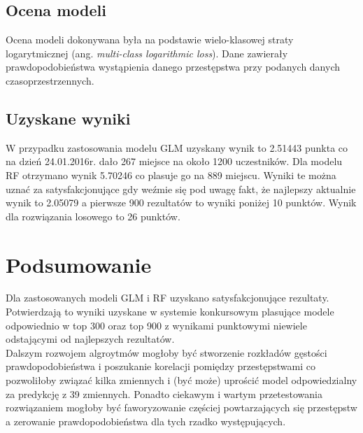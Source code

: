 \documentclass[11pt]{article} %
\begin{document}
\subsection{Ocena modeli}

Ocena modeli dokonywana była na podstawie wielo-klasowej straty logarytmicznej (ang. \textit{multi-class logarithmic loss}). Dane zawierały prawdopodobieństwa wystąpienia danego przestępstwa przy podanych danych czasoprzestrzennych. \\

\subsection{Uzyskane wyniki}


W przypadku zastosowania modelu GLM uzyskany wynik to 2.51443 punkta co na dzień 24.01.2016r. dało 267 miejsce na około 1200 uczestników. Dla modelu RF otrzymano wynik 5.70246 co plasuje go na 889 miejscu. Wyniki te można uznać za satysfakcjonujące gdy weźmie się pod uwagę fakt, że najlepszy aktualnie wynik to 2.05079 a pierwsze 900 rezultatów to wyniki poniżej 10 punktów. Wynik dla rozwiązania losowego to 26 punktów. \\


\section{Podsumowanie}

Dla zastosowanych modeli GLM i RF uzyskano satysfakcjonujące rezultaty. Potwierdzają to wyniki uzyskane w systemie konkursowym plasujące modele odpowiednio w top 300 oraz top 900 z wynikami punktowymi niewiele odstającymi od najlepszych rezultatów. \\

Dalszym rozwojem algroytmów mogłoby być stworzenie rozkładów gęstości prawdopodobieństwa i poszukanie korelacji pomiędzy przestępstwami co pozwoliłoby związać kilka zmiennych i (być może) uprościć model odpowiedzialny za predykcję z 39 zmiennych. Ponadto ciekawym i wartym przetestowania rozwiązaniem mogłoby być faworyzowanie częściej powtarzających się przestępstw a zerowanie prawdopodobieństwa dla tych rzadko występujących. \\
\end{document}
